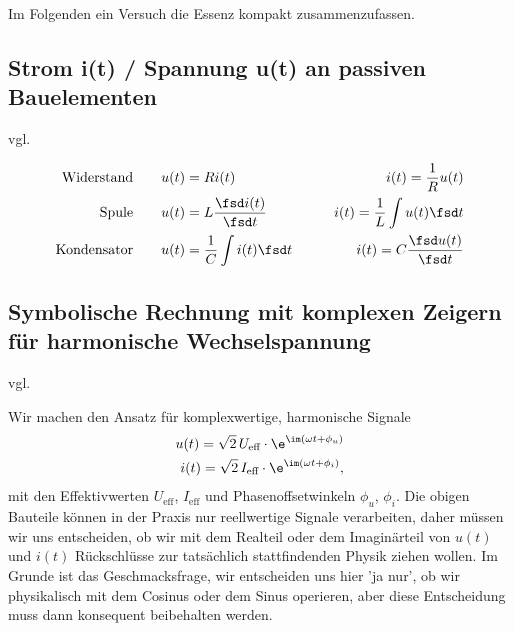 Im Folgenden ein Versuch die Essenz kompakt zusammenzufassen.

\subsection{Strom i(t) / Spannung u(t) an passiven Bauelementen}

vgl. \cite[Kap. 10.2.2]{Marinescu2020}

\begin{align}
\text{Widerstand} \qquad & u(t) = R i(t) \qquad& i(t) = \frac{1}{R} u(t)\\
\text{Spule} \qquad & u(t) = L \frac{\fsd i(t)}{\fsd t} \qquad& i(t) = \frac{1}{L} \int u(t) \fsd t\\
\text{Kondensator} \qquad & u(t) = \frac{1}{C} \int i(t) \fsd t \qquad& i(t) = C \frac{\fsd u(t)}{\fsd t}
\end{align}

\subsection{Symbolische Rechnung mit komplexen Zeigern für harmonische Wechselspannung}

vgl. \cite[Kap. 10.3]{Marinescu2020}

Wir machen den Ansatz für komplexwertige, harmonische Signale
\begin{align}
u(t) = \sqrt{2} \, U_\text{eff} \cdot \e^{\im(\omega t + \phi_u)}\\
i(t) = \sqrt{2} \, I_\text{eff} \cdot \e^{\im(\omega t + \phi_i)},
\end{align}
mit den Effektivwerten $U_\text{eff}$, $I_\text{eff}$ und Phasenoffsetwinkeln
$\phi_u$, $\phi_i$.
%
Die obigen Bauteile können in der Praxis nur reellwertige Signale
verarbeiten, daher müssen wir uns entscheiden, ob wir mit dem Realteil oder dem
Imaginärteil von $u(t)$ und $i(t)$ Rückschlüsse zur tatsächlich stattfindenden
Physik ziehen wollen.
Im Grunde ist das Geschmacksfrage, wir entscheiden uns hier 'ja nur', ob wir
physikalisch mit dem Cosinus oder dem Sinus operieren, aber diese Entscheidung
muss dann konsequent beibehalten werden.

